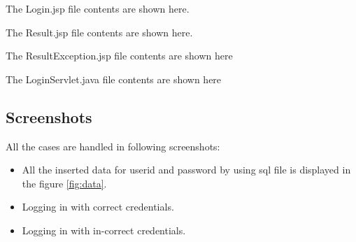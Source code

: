 \documentclass[12pt]{article}
\begin{document}
\newpage

The Login.jsp file contents are shown here.
\vspace{5mm} \\

\newpage


\newpage

The Result.jsp file contents are shown here.
\vspace{5mm} \\

\newpage

The ResultException.jsp file contents are shown here
\vspace{5mm} \\

\newpage

The LoginServlet.java file contents are shown here
\vspace{5mm} \\

\newpage


\newpage

\subsection{Screenshots}

All the cases are handled in following screenshots: 
\begin{itemize}
    \item All the inserted data for userid and password by using sql file is displayed in the figure \ref{fig:data}.
    \item Logging in with correct credentials.
    \item Logging in with in-correct credentials.
\end{itemize}
\end{document}
